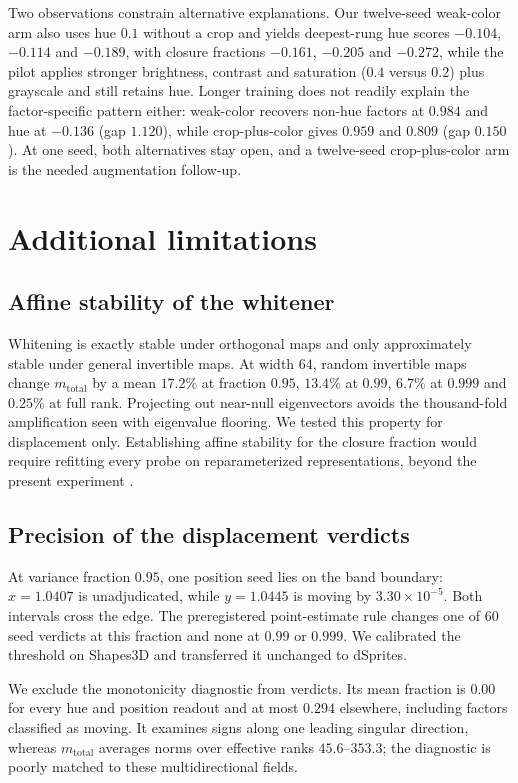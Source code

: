 \documentclass[10pt]{article}
\begin{document}
Two observations constrain alternative explanations. Our twelve-seed weak-color arm also uses hue
$0.1$ without a crop and yields deepest-rung hue scores $-0.104$, $-0.114$ and $-0.189$, with
closure fractions $-0.161$, $-0.205$ and $-0.272$, while the pilot applies stronger brightness,
contrast and saturation ($0.4$ versus $0.2$) plus grayscale and still retains hue. Longer
training does not readily explain the factor-specific pattern either: weak-color recovers non-hue
factors at $0.984$ and hue at $-0.136$ (gap $1.120$), while crop-plus-color gives $0.959$ and
$0.809$ (gap $0.150$). At one seed, both alternatives stay open, and a twelve-seed crop-plus-color
arm is the needed augmentation follow-up.

\section{Additional limitations}
\label{app:limits}
\subsection*{Affine stability of the whitener}
Whitening is exactly stable under orthogonal maps and only approximately stable under general
invertible maps. At width $64$, random invertible maps change $m_{\mathrm{total}}$ by a mean
$17.2\%$ at fraction $0.95$, $13.4\%$ at $0.99$, $6.7\%$ at $0.999$ and $0.25\%$ at full rank.
Projecting out near-null eigenvectors avoids the thousand-fold amplification seen with eigenvalue
flooring. We tested this property for displacement only. Establishing affine stability for the
closure fraction would require refitting every probe on reparameterized representations, beyond
the present experiment \citep{lee2026shallow}.

\subsection*{Precision of the displacement verdicts}
At variance fraction $0.95$, one position seed lies on the band boundary: $x=1.0407$ is
unadjudicated, while $y=1.0445$ is moving by $3.30 \times 10^{-5}$. Both intervals cross the edge.
The preregistered point-estimate rule changes one of $60$ seed verdicts at this fraction and none at
$0.99$ or $0.999$. We calibrated the threshold on Shapes3D and transferred it unchanged to dSprites.

We exclude the monotonicity diagnostic from verdicts. Its mean fraction is $0.00$ for every hue
and position readout and at most $0.294$ elsewhere, including factors classified as moving. It
examines signs along one leading singular direction, whereas $m_{\mathrm{total}}$ averages norms
over effective ranks $45.6$--$353.3$; the diagnostic is poorly matched to these multidirectional
fields.
\end{document}
